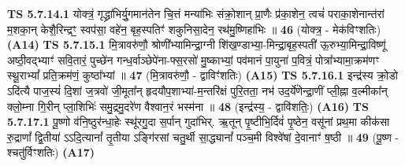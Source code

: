 \documentclass[17pt]{extarticle}
\begin{document}
                                        \textbf{ TS 5.7.14.1} \newline
                  योक्त्रं॒ गृद्ध्रा॑भिर्यु॒गमान॑तेन चि॒त्तं मन्या॑भिः संक्रो॒शान् प्रा॒णैः प्र॑का॒शेन॒ त्वचं॑ पराका॒शेनान्त॑रां म॒शका॒न् केशै॒रिन्द्रꣳ॒॒ स्वप॑सा॒ वहे॑न॒ बृह॒स्पतिꣳ॑ शकुनिसा॒देन॒ रथ॑मु॒ष्णिहा॑भिः ॥ \textbf{  46} \newline
                  \newline
                      (योक्त्र॒ - मेक॑विꣳशतिः)  \textbf{(A14)} \newline \newline
                                        \textbf{ TS 5.7.15.1} \newline
                  मि॒त्रावरु॑णौ॒ श्रोणी᳚भ्यामिन्द्रा॒ग्नी शि॑ख॒ण्डाभ्या॒-मिन्द्रा॒बृह॒स्पती॑ ऊ॒रुभ्या॒मिन्द्रा॒विष्णू॑ अष्ठी॒वद्भ्याꣳ॑ सवि॒तारं॒ पुच्छे॑न गन्ध॒र्वाञ्छेपे॑ना-फ्स॒रसो॑ मु॒ष्काभ्यां॒ पव॑मानं पा॒युना॑ प॒वित्रं॒ पोत्रा᳚भ्यामा॒क्रम॑णꣳ स्थू॒राभ्यां᳚ प्रति॒क्रम॑णं॒ कुष्ठा᳚भ्यां ॥ \textbf{  47} \newline
                  \newline
                      (मि॒त्रावरु॑णौ॒ - द्वाविꣳ॑शतिः)  \textbf{(A15)} \newline \newline
                                        \textbf{ TS 5.7.16.1} \newline
                  इन्द्र॑स्य क्रो॒डो ऽदि॑त्यै पाज॒स्यं॑ दि॒शां ज॒त्रवो॑ जी॒मूता᳚न् हृदयौप॒शाभ्या॑-म॒न्तरि॑क्षं पुरि॒तता॒ नभ॑ उद॒र्ये॑णेन्द्रा॒णीं प्ली॒ह्ना व॒ल्मीका᳚न् क्लो॒म्ना गि॒रीन् प्ला॒शिभिः॑ समु॒द्रमु॒दरे॑ण वैश्वान॒रं भस्म॑ना ॥ \textbf{  48} \newline
                  \newline
                      (इन्द्र॑स्य॒ - द्वावि॑शतिः॒)  \textbf{(A16)} \newline \newline
                                        \textbf{ TS 5.7.17.1} \newline
                  पू॒ष्णो व॑नि॒ष्ठुर॑न्धा॒हेः स्थू॑रगु॒दा स॒र्पान् गुदा॑भिर्. ऋ॒तून् पृ॒ष्टीभि॒र्दिवं॑ पृ॒ष्ठेन॒ वसू॑नां प्रथ॒मा कीक॑सा रु॒द्राणां᳚ द्वि॒तीया॑ ऽऽदि॒त्यानां᳚ तृ॒तीया ऽङ्गि॑रसां चतु॒र्थी सा॒द्ध्यानां᳚ पञ्च॒मी विश्वे॑षां दे॒वानाꣳ॑ ष॒ष्ठी ॥ \textbf{  49} \newline
                  \newline
                      (पू॒ष्ण - श्चतु॑र्विꣳशतिः)  \textbf{(A17)} \newline \newline
\end{document}
